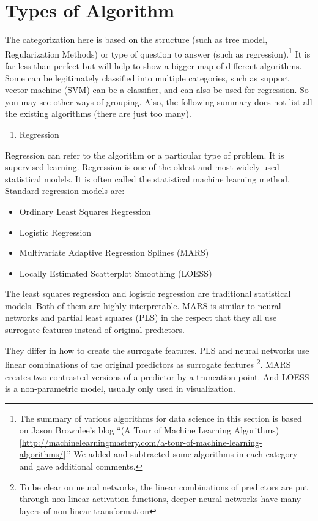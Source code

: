 \documentclass[12pt,]{krantz}
\providecommand{\tightlist}{%
  \setlength{\itemsep}{0pt}\setlength{\parskip}{0pt}}
\theoremstyle{definition}
\theoremstyle{definition}
\theoremstyle{definition}
\theoremstyle{remark}
\begin{document}
\section{Types of Algorithm}\label{types-of-algorithm}

The categorization here is based on the structure (such as tree model,
Regularization Methods) or type of question to answer (such as
regression).\footnote{The summary of various algorithms for data science
  in this section is based on Jason Brownlee's blog ``(A Tour of Machine
  Learning
  Algorithms){[}\url{http://machinelearningmastery.com/a-tour-of-machine-learning-algorithms/}{]}.''
  We added and subtracted some algorithms in each category and gave
  additional comments.} It is far less than perfect but will help to
show a bigger map of different algorithms. Some can be legitimately
classified into multiple categories, such as support vector machine
(SVM) can be a classifier, and can also be used for regression. So you
may see other ways of grouping. Also, the following summary does not
list all the existing algorithms (there are just too many).

\begin{enumerate}
\def\labelenumi{\arabic{enumi}.}
\tightlist
\item
  Regression
\end{enumerate}

Regression can refer to the algorithm or a particular type of problem.
It is supervised learning. Regression is one of the oldest and most
widely used statistical models. It is often called the statistical
machine learning method. Standard regression models are:

\begin{itemize}
\tightlist
\item
  Ordinary Least Squares Regression
\item
  Logistic Regression
\item
  Multivariate Adaptive Regression Splines (MARS)
\item
  Locally Estimated Scatterplot Smoothing (LOESS)
\end{itemize}

The least squares regression and logistic regression are traditional
statistical models. Both of them are highly interpretable. MARS is
similar to neural networks and partial least squares (PLS) in the
respect that they all use surrogate features instead of original
predictors.

They differ in how to create the surrogate features. PLS and neural
networks use linear combinations of the original predictors as surrogate
features \footnote{To be clear on neural networks, the linear
  combinations of predictors are put through non-linear activation
  functions, deeper neural networks have many layers of non-linear
  transformation}. MARS creates two contrasted versions of a predictor
by a truncation point. And LOESS is a non-parametric model, usually only
used in visualization.
\end{document}
